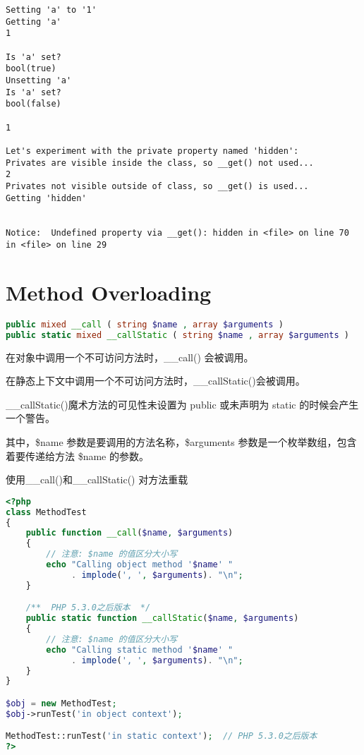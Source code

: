 \begin{verbatim}
Setting 'a' to '1'
Getting 'a'
1

Is 'a' set?
bool(true)
Unsetting 'a'
Is 'a' set?
bool(false)

1

Let's experiment with the private property named 'hidden':
Privates are visible inside the class, so __get() not used...
2
Privates not visible outside of class, so __get() is used...
Getting 'hidden'


Notice:  Undefined property via __get(): hidden in <file> on line 70 in <file> on line 29
\end{verbatim}



\section{Method Overloading}


\begin{lstlisting}[language=PHP]
public mixed __call ( string $name , array $arguments )
public static mixed __callStatic ( string $name , array $arguments )
\end{lstlisting}


\begin{compactitem}
\item 在对象中调用一个不可访问方法时，\_\_call() 会被调用。
\item 在静态上下文中调用一个不可访问方法时，\_\_callStatic()会被调用。
\end{compactitem}

\_\_callStatic()魔术方法的可见性未设置为 public 或未声明为 static 的时候会产生一个警告。

其中，\$name 参数是要调用的方法名称，\$arguments 参数是一个枚举数组，包含着要传递给方法 \$name 的参数。

\begin{example}
使用\_\_call()和\_\_callStatic() 对方法重载
\begin{lstlisting}[language=PHP]
<?php
class MethodTest 
{
    public function __call($name, $arguments) 
    {
        // 注意: $name 的值区分大小写
        echo "Calling object method '$name' "
             . implode(', ', $arguments). "\n";
    }

    /**  PHP 5.3.0之后版本  */
    public static function __callStatic($name, $arguments) 
    {
        // 注意: $name 的值区分大小写
        echo "Calling static method '$name' "
             . implode(', ', $arguments). "\n";
    }
}

$obj = new MethodTest;
$obj->runTest('in object context');

MethodTest::runTest('in static context');  // PHP 5.3.0之后版本
?>
\end{lstlisting}
\end{example}

